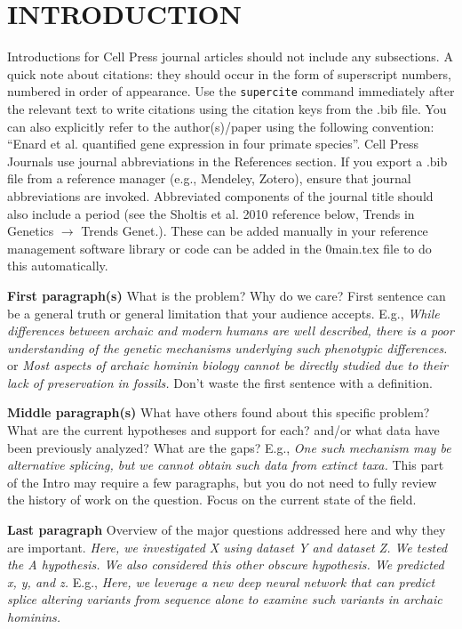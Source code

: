 \section{INTRODUCTION}
\introTips %
Introductions for Cell Press journal articles  should not include any subsections. A quick note about citations: they should occur in the form of superscript numbers, numbered in order of appearance\supercite{enardIntraInterspecificVariation2002,kingEvolutionTwoLevels1975,sholtisGeneRegulationOrigins2010}. Use the \texttt{supercite} command immediately after the relevant text to write citations using the citation keys from the .bib file. You can also explicitly refer to the author(s)/paper using the following convention: ``Enard et al.\supercite{enardIntraInterspecificVariation2002} quantified gene expression in four primate species''. Cell Press Journals use journal abbreviations in the References section. If you export a .bib file from a reference manager (e.g., Mendeley, Zotero), ensure that journal abbreviations are invoked. Abbreviated components of the journal title should also include a period (see the Sholtis et al. 2010 reference below, Trends in Genetics $\rightarrow$ Trends Genet.). These can be added manually in your reference management software library or code can be added in the 0main.tex file to do this automatically.

\textbf{First paragraph(s)} What is the problem? Why do we care?  First sentence can be a general truth or general limitation that your audience accepts. E.g., \textit{While differences between archaic and modern humans are well described, there is a poor understanding of the genetic mechanisms underlying such phenotypic differences.} or  \textit{Most aspects of archaic hominin biology cannot be directly studied due to their lack of preservation in fossils.} Don't waste the first sentence with a definition.

\textbf{Middle paragraph(s)} What have others found about this specific problem? What are the current hypotheses and support for each? and/or what data have been previously analyzed? What are the gaps? E.g., \textit{One such mechanism may be alternative splicing, but we cannot obtain such data from extinct taxa.} This part of the Intro may require a few paragraphs, but you do not need to fully review the history of work on the question. Focus on the current state of the field.

\textbf{Last paragraph} Overview of the major questions addressed here and why they are important. \textit{Here, we investigated X using dataset Y and dataset Z. We tested the A hypothesis. We also considered this other obscure hypothesis. We predicted x, y, and z.} E.g., \textit{Here, we leverage a new deep neural network that can predict splice altering variants from sequence alone to examine such variants in archaic hominins.}